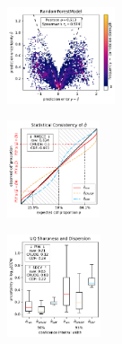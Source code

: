 \begin{figure}[H]
    \begin{subfigure}
    \centering
    \includegraphics[width=0.348\textwidth,valign=t]{uncertainty/figures/uq.randomforestmodel-correlation.pdf}
    \end{subfigure}
    \begin{subfigure}
    \centering
    \includegraphics[width=0.299\textwidth,valign=t]{uncertainty/figures/uq.randomforestmodel-consistency.pdf}
    \end{subfigure}
    \begin{subfigure}
    \centering
    \includegraphics[width=0.303\textwidth,valign=t]{uncertainty/figures/uq.randomforestmodel-sharpness.pdf}
    \end{subfigure}


\end{figure}

